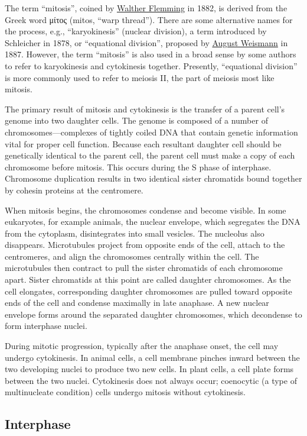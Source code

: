 The term ``mitosis'', coined by \href{https://en.wikipedia.org/wiki/Walther_Flemming}{Walther Flemming} in 1882, is derived from the Greek word μίτος (mitos, ``warp thread''). There are some alternative names for the process, e.g., ``karyokinesis'' (nuclear division), a term introduced by Schleicher in 1878, or ``equational division'', proposed by \href{https://en.wikipedia.org/wiki/August_Weismann}{August Weismann} in 1887. However, the term ``mitosis'' is also used in a broad sense by some authors to refer to karyokinesis and cytokinesis together. Presently, ``equational division'' is more commonly used to refer to meiosis II, the part of meiosis most like mitosis.

The primary result of mitosis and cytokinesis is the transfer of a parent cell's genome into two daughter cells. The genome is composed of a number of chromosomes---complexes of tightly coiled DNA that contain genetic information vital for proper cell function. Because each resultant daughter cell should be genetically identical to the parent cell, the parent cell must make a copy of each chromosome before mitosis. This occurs during the S phase of interphase. Chromosome duplication results in two identical sister chromatids bound together by cohesin proteins at the centromere.

When mitosis begins, the chromosomes condense and become visible. In some eukaryotes, for example animals, the nuclear envelope, which segregates the DNA from the cytoplasm, disintegrates into small vesicles. The nucleolus also disappears. Microtubules project from opposite ends of the cell, attach to the centromeres, and align the chromosomes centrally within the cell. The microtubules then contract to pull the sister chromatids of each chromosome apart. Sister chromatids at this point are called daughter chromosomes. As the cell elongates, corresponding daughter chromosomes are pulled toward opposite ends of the cell and condense maximally in late anaphase. A new nuclear envelope forms around the separated daughter chromosomes, which decondense to form interphase nuclei.

During mitotic progression, typically after the anaphase onset, the cell may undergo cytokinesis. In animal cells, a cell membrane pinches inward between the two developing nuclei to produce two new cells. In plant cells, a cell plate forms between the two nuclei. Cytokinesis does not always occur; coenocytic (a type of multinucleate condition) cells undergo mitosis without cytokinesis.

\hypertarget{interphase}{%
\subsection{Interphase}\label{interphase}}

